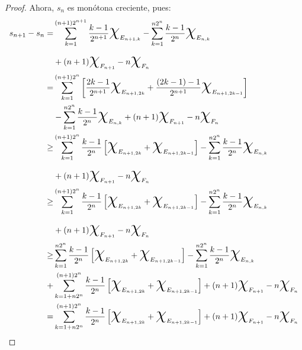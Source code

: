\documentclass[11pt, a4paper]{article}
\theoremstyle{theorem-style}
\theoremstyle{definition-style}
\theoremstyle{remark-style}
\theoremstyle{example-style}
\begin{document}
\begin{proof}
  Ahora, ${s_n}$ es monótona creciente, pues:
  \[
      \begin{aligned}
 s_{n+1}-s_n =&  \sum_{k=1}^{(n+1)2^{n+1}} \frac{k-1}{2^{n+1}} \text{\huge $\chi$}_{E_{n+1,k}} 
				- \sum_{k=1}^{n2^n} \frac{k-1}{2^n} \text{\huge $\chi$}_{E_{n,k}} 
				\\
			&+	(n+1) \text{\huge{$\chi$}}_{F_{n+1}} - n \text{\huge{$\chi$}}_{F_n} 
				\\ %
			=& \sum_{k=1}^{(n+1)2^{n}} \left[ \frac{2k-1}{2^{n+1}} \text{\huge $\chi$}_{E_{n+1,2k}} 
									+ \frac{(2k-1)-1}{2^{n+1}} \text{\huge $\chi$}_{E_{n+1,2k-1}}  \right]
									\\
			&
				- \sum_{k=1}^{n2^n} \frac{k-1}{2^n} \text{\huge $\chi$}_{E_{n,k}} 
				+	(n+1) \text{\huge{$\chi$}}_{F_{n+1}} - n \text{\huge{$\chi$}}_{F_n}
				\\
			\geq& \sum_{k=1}^{(n+1)2^{n}} \frac{k-1}{2^{n}} \left[  \text{\huge $\chi$}_{E_{n+1,2k}} 
									+ \text{\huge $\chi$}_{E_{n+1,2k-1}}  \right]
				- \sum_{k=1}^{n2^n} \frac{k-1}{2^n} \text{\huge $\chi$}_{E_{n,k}} 
				\\
				&+	(n+1) \text{\huge{$\chi$}}_{F_{n+1}} - n \text{\huge{$\chi$}}_{F_n}\\
				\geq& \sum_{k=1}^{(n+1)2^{n}} \frac{k-1}{2^{n}} \left[  \text{\huge $\chi$}_{E_{n+1,2k}} 
									+ \text{\huge $\chi$}_{E_{n+1,2k-1}}  \right]
				- \sum_{k=1}^{n2^n} \frac{k-1}{2^n} \text{\huge $\chi$}_{E_{n,k}} 
				\\
				&+	(n+1) \text{\huge{$\chi$}}_{F_{n+1}} - n \text{\huge{$\chi$}}_{F_n}
				\\ %
				\geq& \sum_{k=1}^{n2^{n}} \frac{k-1}{2^{n}} \left[  \text{\huge $\chi$}_{E_{n+1,2k}} 
									+ \text{\huge $\chi$}_{E_{n+1,2k-1}}  \right]
				- \sum_{k=1}^{n2^n} \frac{k-1}{2^n} \text{\huge $\chi$}_{E_{n,k}} 
				\\
				+&\sum_{k=1+n 2^n}^{(n+1)2^{n}} \frac{k-1}{2^{n}} \left[  \text{\huge $\chi$}_{E_{n+1,2k}} 
									+ \text{\huge $\chi$}_{E_{n+1,2k-1}}  \right]
				+	(n+1) \text{\huge{$\chi$}}_{F_{n+1}} - n \text{\huge{$\chi$}}_{F_n}
                                \\
                                = & \sum_{k=1+n 2^n}^{(n+1)2^{n}} \frac{k-1}{2^{n}} \left[  \text{\huge $\chi$}_{E_{n+1,2k}} 
									+ \text{\huge $\chi$}_{E_{n+1,2k-1}}  \right]
				+	(n+1) \text{\huge{$\chi$}}_{F_{n+1}} - n \text{\huge{$\chi$}}_{F_n}
 \end{aligned}
      \]


\end{proof}
\end{document}
